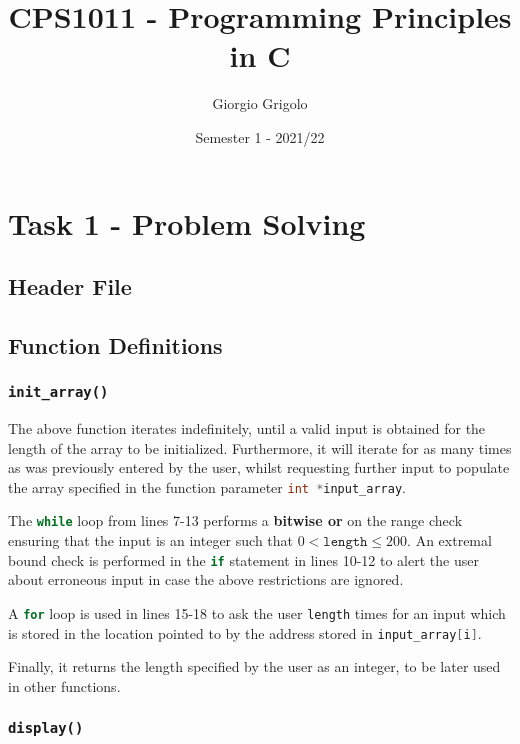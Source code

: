 \documentclass{article}
\title{CPS1011 - Programming Principles in C}
\author{Giorgio Grigolo}
\date{Semester 1 - 2021/22}
\newcommand{\code}[1]{\lstinline[language=C]!#1!}
\begin{document}
	\maketitle
	\tableofcontents
	\newpage

	\section{Task 1 - Problem Solving}

	\subsection{Header File}

	

	\subsection{Function Definitions}
	\subsubsection{\texttt{init\_array()}}
		
	

	The above function iterates indefinitely, until a valid input is obtained for the length of the
	array to be initialized. Furthermore, it will iterate for as many times as was previously entered
	by the user, whilst requesting further input to populate the array specified in the function
	parameter \code{int *input_array}.

	The \code{while} loop from lines 7-13 performs a \textbf{bitwise or} on the
	range check ensuring that the input is an integer such that $0 < \texttt{length} \leq 200$. 
	An extremal bound check is performed in the \code{if} statement in lines 10-12 to alert the user
	about erroneous input in case the above restrictions are ignored.

	A \code{for} loop is used in lines 15-18 to ask the user \code{length} times for an input which is
	stored in the location pointed to by the address stored in \code{input_array[i]}.

	Finally, it returns the length specified by the user as an integer, to be later used in other functions.


	\newpage
	 
	\subsubsection{\texttt{display()}}
\end{document}
